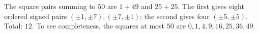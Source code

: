 The square pairs summing to $50$ are $1+49$ and $25+25$. The first gives eight ordered signed pairs $(\pm1,\pm7),(\pm7,\pm1)$; the second gives four $(\pm5,\pm5)$. Total: $\boxed{12}$. To see completeness, the squares at most $50$ are $0,1,4,9,16,25,36,49$.
